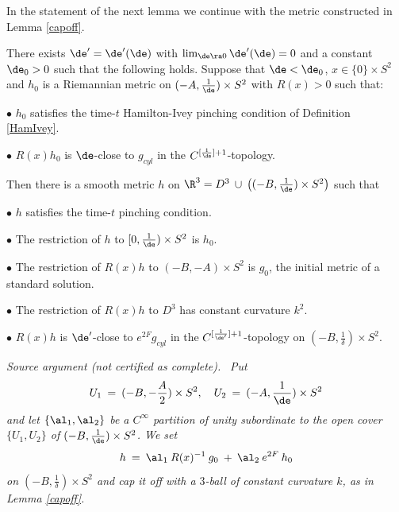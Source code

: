 In the statement of the next lemma we continue with the metric
constructed in Lemma \ref{capoff}.
\begin{lemma}
  \label{lem:kl-surgery-pinching-condition-existence-standard-solutions}

\label{preservingphipinching}
There exists $\de'=\de'(\de)$ with $\lim_{\de\ra 0}\de'(\de)=0$ and a constant
$\de_0>0$
 such that the following holds.  Suppose that $\de<\de_0$, $x\in \{0\} \times S^2$
and $h_0$ is a Riemannian metric
on $(-A,\frac{1}{\de}) \times S^2$ with $R(x) > 0$ such that:

\medskip
$\bullet$ $h_0$ satisfies the time-$t$ Hamilton-Ivey pinching condition of
Definition \ref{HamIvey}.

$\bullet$  $R(x)h_0$ is
$\de$-close to $g_{cyl}$ in the $C^{[\frac{1}{\de}]+1}$-topology.

\bigskip
Then there is a smooth metric
$h$ on $\R^3 = D^3 \: \cup \: \left( (-B,\frac{1}{\de}) \times S^2 \right)$
such that

\medskip
$\bullet$ $h$ satisfies the time-$t$ pinching condition.

$\bullet$ The restriction of $h$ to $[0,\frac{1}{\de}) \times S^2$ is $h_0$.

$\bullet$  The restriction of $R(x)h$ to $(-B,-A) \times S^2$ is
$g_{0}$, the initial metric of a standard solution.


$\bullet$  The restriction of $R(x)h$ to $D^3$ has constant curvature $k^2$.

$\bullet$ $R(x)h$ is $\de'$-close to $e^{2F}g_{cyl}$ in the $C^{[\frac{1}{\de'}]+1}$-topology on
$\left( -B, \frac{1}{\delta} \right) \times S^2$.

\end{lemma}
\par\medskip\noindent\textit{Source argument (not certified as complete).}\ \begingroup\itshape
Put
\begin{equation}
U_1 \: = \:  (-B,-\frac{A}{2}) \times S^2,\quad U_2 \: = \:  (-A,\frac{1}{\de}) \times S^2
\end{equation}
and let $\{\al_1,\al_2\}$ be a $C^{\infty}$ partition of unity subordinate to the open
cover $\{U_1,U_2\}$ of $(-B,\frac{1}{\de}) \times S^2$.  We set
\begin{equation}
h \: = \:  \al_1 \: R(x)^{-1} \: g_{0} \: + \: \al_2 \: e^{2F} \: h_0
\end{equation}
on $\left( -B, \frac{1}{\delta} \right) \times S^2$ and cap it off with a
$3$-ball of constant curvature $k$, as in Lemma \ref{capoff}.


